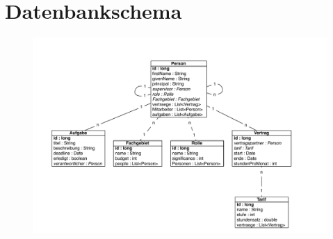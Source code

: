 \documentclass[article,colorback,accentcolor=tud2c]{tudreport}
\begin{document}
\section{Datenbankschema} %
\label{sec:datenbankschema}

\begin{figure}[h]
    \begin{center}
        \includegraphics[scale=0.6]{img/db}
    \end{center}
\end{figure}

\end{document}
